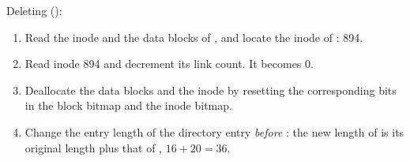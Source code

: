 Deleting  ():
\begin{enumerate}
  \item Read the inode and the data blocks of , and locate the inode of : 894.
  \item Read inode 894 and decrement its link count. It becomes 0.
  \item Deallocate the data blocks and the inode by resetting the corresponding bits in the block bitmap and the inode bitmap.
  \item Change the entry length of the directory entry \emph{before} : the new length of  is its original length plus that of , $16 + 20 = 36$.
\end{enumerate}

